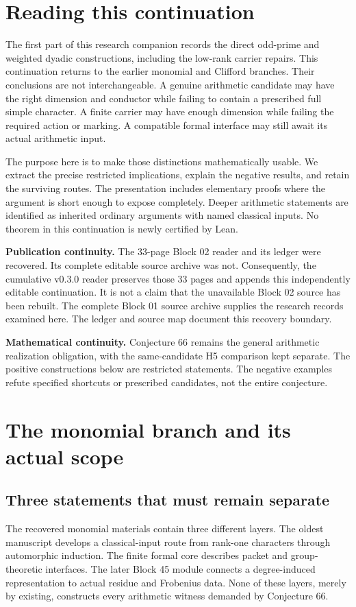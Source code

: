 \documentclass[11pt]{article}
\theoremstyle{definition}\newtheorem{definition}[proposition]{Definition}
\begin{document}
\KomorebiCover
\section*{Reading this continuation}
The first part of this research companion records the direct odd-prime and weighted dyadic constructions, including the low-rank carrier repairs. This continuation returns to the earlier monomial and Clifford branches. Their conclusions are not interchangeable. A genuine arithmetic candidate may have the right dimension and conductor while failing to contain a prescribed full simple character. A finite carrier may have enough dimension while failing the required action or marking. A compatible formal interface may still await its actual arithmetic input.

The purpose here is to make those distinctions mathematically usable. We extract the precise restricted implications, explain the negative results, and retain the surviving routes. The presentation includes elementary proofs where the argument is short enough to expose completely. Deeper arithmetic statements are identified as inherited ordinary arguments with named classical inputs. No theorem in this continuation is newly certified by Lean.

\textbf{Publication continuity.} The 33-page Block 02 reader and its ledger were recovered. Its complete editable source archive was not. Consequently, the cumulative v0.3.0 reader preserves those 33 pages and appends this independently editable continuation. It is not a claim that the unavailable Block 02 source has been rebuilt. The complete Block 01 source archive supplies the research records examined here. The ledger and source map document this recovery boundary.

\textbf{Mathematical continuity.} Conjecture 66 remains the general arithmetic realization obligation, with the same-candidate H5 comparison kept separate. The positive constructions below are restricted statements. The negative examples refute specified shortcuts or prescribed candidates, not the entire conjecture.

\tableofcontents
\clearpage
\section{The monomial branch and its actual scope}\label{sec:monomial}
\subsection{Three statements that must remain separate}
The recovered monomial materials contain three different layers. The oldest manuscript develops a classical-input route from rank-one characters through automorphic induction. The finite formal core describes packet and group-theoretic interfaces. The later Block 45 module connects a degree-induced representation to actual residue and Frobenius data. None of these layers, merely by existing, constructs every arithmetic witness demanded by Conjecture 66.
\end{document}
